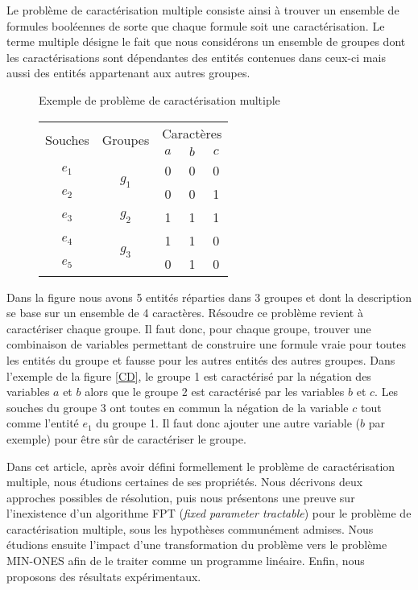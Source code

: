 Le problème de caractérisation multiple consiste ainsi à trouver un ensemble de
formules booléennes de sorte que chaque formule soit une caractérisation. Le terme
multiple désigne le fait que nous considérons un ensemble de groupes dont les
caractérisations sont dépendantes des entités contenues dans ceux-ci mais aussi
des entités appartenant aux autres groupes.

\begin{figure}[H]{Exemple de problème de caractérisation multiple}
\begin{center}
\begin{tabular}{|c||c|c|c|c|}
\hline
\multirow{2}{*}{Souches}&\multirow{2}{*}{Groupes}&\multicolumn{3}{c|}{Caractères
}\\
&&$a$&$b$&$c$\\
\hline
\hline
$e_1$&\multirow{2}{*}{$g_1$}&\cellcolor{lightgray}0&\cellcolor{lightgray}0&0\\
\cline{1-1} \cline{3-5}
$e_2$&&\cellcolor{lightgray}0& \cellcolor{lightgray}0&1\\
\hline
\hline
$e_3$&$g_2$&1&\cellcolor{lightgray}1&\cellcolor{lightgray}1\\
\hline
\hline
$e_4$&\multirow{2}{*}{$g_3$}&1&\cellcolor{lightgray}1&\cellcolor{lightgray}0\\
\cline{1-1} \cline{3-5}
$e_5$&&0&\cellcolor{lightgray}1&\cellcolor{lightgray}0\\
\hline
\end{tabular}
\end{center}
\end{figure}

Dans la figure  nous avons 5 entités réparties dans 3 groupes et dont
la description se base sur un ensemble de 4 caractères.
Résoudre ce problème revient à caractériser chaque groupe. Il faut donc, pour
chaque groupe, trouver une combinaison de  variables permettant de construire une formule vraie pour toutes les
entités du groupe et fausse pour les autres entités des autres
groupes. Dans l'exemple de la figure \ref{CD}, le groupe 1 est caractérisé par
la négation des variables $a$ et $b$  alors que le groupe 2 est caractérisé par
les variables $b$ et $c$. Les souches du groupe 3 ont toutes en commun la
négation de la variable $c$ tout comme l'entité $e_1$ du groupe 1. Il faut donc
ajouter une autre variable ($b$ par exemple) pour être sûr de caractériser le
groupe.

Dans cet article, après avoir défini formellement le problème de caractérisation
multiple, nous étudions certaines de ses propriétés. Nous décrivons deux approches possibles de résolution, puis nous présentons une preuve sur l'inexistence d'un algorithme FPT ({\em fixed parameter tractable}) pour le problème de caractérisation multiple, sous les hypothèses communément admises. Nous étudions ensuite l'impact d'une transformation du problème vers le problème MIN-ONES afin de le traiter comme un programme linéaire. Enfin, nous proposons des résultats expérimentaux.

